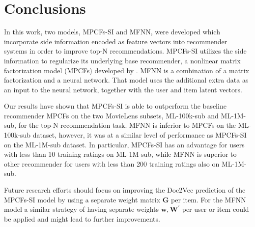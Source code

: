 \chapter{Conclusions}
\label{c:conclusions}

In this work, two models, MPCFs-SI and MFNN, were developed which incorporate side information encoded as feature vectors into recommender systems in order to improve top-N recommendations.
MPCFs-SI utilizes the side information to regularize its underlying base recommender, a nonlinear matrix factorization model (MPCFs) developed by \cite{Kabbur2015}.
MFNN is a combination of a matrix factorization and a neural network.
That model uses the additional extra data as an input to the neural network, together with the user and item latent vectors.

Our results have shown that MPCFs-SI is able to outperform the baseline recommender MPCFs on the two MovieLens subsets, ML-100k-sub and ML-1M-sub, for the top-N recommendation task.
MFNN is inferior to MPCFs on the ML-100k-sub dataset, however, it was at a similar level of performance as MPCFs-SI on the ML-1M-sub dataset.
In particular, MPCFs-SI has an advantage for users with less than 10 training ratings on ML-1M-sub, while MFNN is superior to other recommender for users with less than 200 training ratings also on ML-1M-sub.

Future research efforts should focus on improving the Doc2Vec prediction of the MPCFs-SI model by using a separate weight matrix $\mathbf{G}$ per item.
For the MFNN model a similar strategy of having separate weights $\mathbf{w}, \mathbf{W^\prime}$ per user or item could be applied and might lead to further improvements.